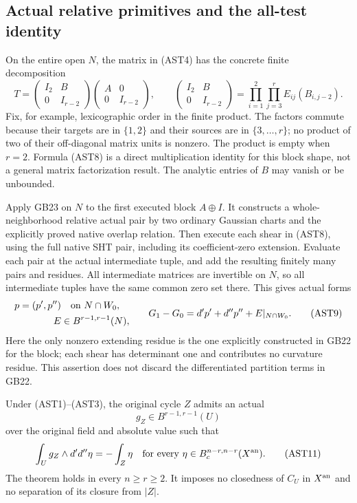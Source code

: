 \subsection{Actual relative primitives and the all-test identity}

On the entire open $N$, the matrix in (AST4) has the concrete
finite decomposition
\[
 T=\begin{pmatrix}I_2&B\\0&I_{r-2}\end{pmatrix}
                    \begin{pmatrix}A&0\\0&I_{r-2}\end{pmatrix},
 \qquad
 \begin{pmatrix}I_2&B\\0&I_{r-2}\end{pmatrix}
       =\prod_{i=1}^{2}\prod_{j=3}^{r} E_{ij}(B_{i,j-2}).
 \tag{AST8}
\]
Fix, for example, lexicographic order in the finite product.
The factors commute because their targets are in $\{1,2\}$
and their sources are in $\{3,\ldots,r\}$; no product of two
of their off-diagonal matrix units is nonzero.  The product is
empty when $r=2$.  Formula (AST8) is a direct multiplication
identity for this block shape, not a general matrix factorization
result.  The analytic entries of $B$ may vanish or be unbounded.

Apply GB23 on $N$ to the first executed block $A\oplus I$.
It constructs a whole-neighborhood relative actual pair by
two ordinary Gaussian charts and the explicitly proved native
overlap relation.  Then execute each shear in (AST8), using
the full native SHT pair, including its coefficient-zero
extension.  Evaluate each pair at the actual intermediate
tuple, and add the resulting finitely many pairs and residues.
All intermediate matrices are invertible on $N$, so all
intermediate tuples have the same common zero set there.
This gives actual forms
\[
 \begin{split}
 p=(p',p'')&\quad\hbox{on }N\cap W_0,\\
 E&\in B^{r-1,r-1}(N),
 \end{split}
 \qquad
 G_1-G_0=d'p'+d''p''+E|_{N\cap W_0}.
 \tag{AST9}
\]
Here the only nonzero extending residue is the one explicitly
constructed in GB22 for the block; each shear has determinant
one and contributes no curvature residue.  This assertion
does not discard the differentiated partition terms in GB22.

\begin{theorem}
Under (AST1)--(AST3), the original cycle $Z$ admits an actual
\[
                       g_Z\in B^{r-1,r-1}(U)
 \tag{AST10}
\]
over the original field and absolute value such that
\[
 \int_U g_Z\wedge d'd''\eta=-\int_Z\eta
       \quad\hbox{for every }
       \eta\in B_c^{n-r,n-r}(X^{\rm an}).
 \tag{AST11}
\]
The theorem holds in every $n\ge r\ge2$.  It imposes no
closedness of $C_U$ in $X^{\rm an}$ and no separation of its
closure from $|Z|$.
\end{theorem}

